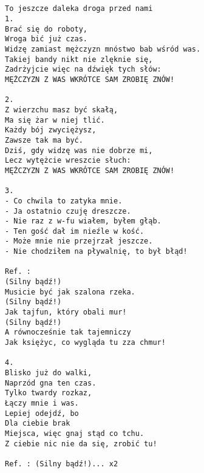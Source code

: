 \documentclass[12pt]{article}
\begin{document}
\subsection*{}
\begin{verbatim}
To jeszcze daleka droga przed nami
1.
Brać się do roboty,
Wroga bić już czas.
Widzę zamiast mężczyzn mnóstwo bab wśród was.
Takiej bandy nikt nie zlęknie się,
Zadrżyjcie więc na dźwięk tych słów:
MĘŻCZYZN Z WAS WKRÓTCE SAM ZROBIĘ ZNÓW!

2.
Z wierzchu masz być skałą,
Ma się żar w niej tlić.
Każdy bój zwyciężysz,
Zawsze tak ma być.
Dziś, gdy widzę was nie dobrze mi,
Lecz wytężcie wreszcie słuch:
MĘŻCZYZN Z WAS WKRÓTCE SAM ZROBIĘ ZNÓW!

3.
- Co chwila to zatyka mnie.
- Ja ostatnio czuję dreszcze.
- Nie raz z w-fu wiałem, byłem głąb.
- Ten gość dał im nieźle w kość.
- Może mnie nie przejrzał jeszcze.
- Nie chodziłem na pływalnię, to był błąd!

Ref. :
(Silny bądź!)
Musicie być jak szalona rzeka.
(Silny bądź!)
Jak tajfun, który obali mur!
(Silny bądź!)
A równocześnie tak tajemniczy
Jak księżyc, co wygląda tu zza chmur!

4.
Blisko już do walki,
Naprzód gna ten czas.
Tylko twardy rozkaz,
Łączy mnie i was.
Lepiej odejdź, bo
Dla ciebie brak
Miejsca, więc gnaj stąd co tchu.
Z ciebie nic nie da się, zrobić tu!

Ref. : (Silny bądź!)... x2
\end{verbatim}
\clearpage

\end{document}

